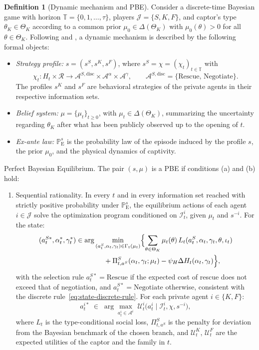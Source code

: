 \documentclass[ecta,nameyear,draft]{econsocart}
\providecommand{\textcite}{\citet}
\theoremstyle{plain}
\theoremstyle{definition}
\newtheorem{definition}[theorem]{Definition}
\newcommand{\ProbE}{\mathbb{P}_{\mathrm{E}}}
\newcommand{\ThetaK}{\Theta_K}
\newcommand{\1}{\mathbf{1}}
\begin{document}
\begin{definition}[Dynamic mechanism and PBE]
\label{def:pbe-mechanism}
Consider a discrete-time Bayesian game with horizon $\mathbb{T}=\{0,1,\ldots,\tau\}$, players $\mathcal{J}=\{S,K,F\}$, and captor's type $\theta_K\in\ThetaK$ according to a common prior $\mu_0\in\Delta(\ThetaK)$ with $\mu_0(\theta)>0$ for all $\theta\in\ThetaK$. Following \textcite{FudenbergTirole1991} and \textcite{KrepsWilson1982}, a dynamic mechanism is described by the following formal objects:

\begin{itemize}
  \item \emph{Strategy profile:} $s=(s^S,s^K,s^F)$, where $s^S=\chi=(\chi_t)_{t\in\mathbb{T}}$ with
  \[
    \chi_t \colon H_t\times\mathcal{R}
    \longrightarrow \mathcal{A}^{S,\mathrm{disc}}\times\mathcal{A}^{\alpha}\times\mathcal{A}^{\gamma},
    \qquad
    \mathcal{A}^{S,\mathrm{disc}}=\{\text{Rescue},\,\text{Negotiate}\}.
  \]
  The profiles $s^K$ and $s^F$ are behavioral strategies of the private agents in their respective information sets.
  \item \emph{Belief system:} $\mu=\{\mu_t\}_{t\ge 0}$, with $\mu_t\in\Delta(\ThetaK)$, summarizing the uncertainty regarding $\theta_K$ after what has been publicly observed up to the opening of $t$.
  \item \emph{Ex-ante law:} $\ProbE^s$ is the probability law of the episode induced by the profile $s$, the prior $\mu_0$, and the physical dynamics of captivity.
\end{itemize}

\smallskip
\noindent Perfect Bayesian Equilibrium. The pair $(s,\mu)$ is a PBE if conditions \textup{(a)} and \textup{(b)} hold:
\begin{enumerate}
  \item[\textup{(a)}] Sequential rationality. In every $t$ and in every information set reached with strictly positive probability under $\ProbE^s$, the equilibrium actions of each agent $i\in\mathcal{J}$ solve the optimization program conditioned on $\mathcal{I}_t^i$, given $\mu_t$ and $s^{-i}$. For the state:
  \[
  \begin{aligned}
  (a_t^{S\ast},\alpha_t^\ast,\gamma_t^\ast)
  &\in
  \arg\min_{(a_t^S,\alpha_t,\gamma_t)\in\Gamma_t(\mu_t)}
  \Bigl\{
  \sum_{\theta\in\ThetaK}\mu_t(\theta)\,L_t(a_t^S,\alpha_t,\gamma_t,\theta,\iota_t)\\
  &\qquad\qquad
  +\Pi_{t,a^S}^S(\alpha_t,\gamma_t;\mu_t)-\psi_H\Delta H_t(\alpha_t,\gamma_t)
  \Bigr\},
  \end{aligned}
  \]
  with the selection rule $a_t^{S\ast}=\text{Rescue}$ if the expected cost of rescue does not exceed that of negotiation, and $a_t^{S\ast}=\text{Negotiate}$ otherwise, consistent with the discrete rule~\eqref{eq:state-discrete-rule}. For each private agent $i\in\{K,F\}$:
  \[
  a_t^{i\ast}\;\in\;
  \arg\max_{a_t^i\in\mathcal{A}^i}
  \;\mathcal{U}^i_t\!\bigl(a_t^i\mid \mathcal{I}_t^i,\chi,s^{-i}\bigr),
  \]
  where $L_t$ is the type-conditional social loss, $\Pi_{t,a^S}^S$ is the penalty for deviation from the Bayesian benchmark of the chosen branch, and $\mathcal{U}^K_t$, $\mathcal{U}^F_t$ are the expected utilities of the captor and the family in $t$.


\end{enumerate}
\end{definition}
\end{document}
